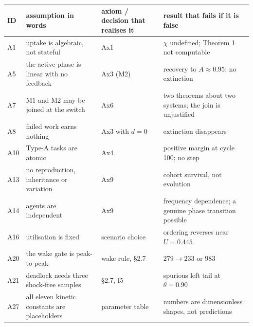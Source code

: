 \documentclass[11pt,a4paper]{article}
\newcounter{none}
\begin{document}
{\def\LTcaptype{none} %
\begin{longtable}[]{@{}
  >{\raggedright\arraybackslash}p{}
  >{\raggedright\arraybackslash}p{}
  >{\raggedright\arraybackslash}p{}
  >{\raggedright\arraybackslash}p{}@{}}
\toprule\noalign{}
\begin{minipage}[b]{\linewidth}\raggedright
ID
\end{minipage} & \begin{minipage}[b]{\linewidth}\raggedright
assumption in words
\end{minipage} & \begin{minipage}[b]{\linewidth}\raggedright
axiom / decision that realises it
\end{minipage} & \begin{minipage}[b]{\linewidth}\raggedright
result that fails if it is false
\end{minipage} \\
\midrule\noalign{}
\endhead
\bottomrule\noalign{}
\endlastfoot
A1 & uptake is algebraic, not stateful & Ax1 & \(\chi\) undefined; Theorem 1 not computable \\
A5 & the active phase is linear with no feedback & Ax3 (M2) & recovery to \(A\approx0.95\); no extinction \\
A7 & M1 and M2 may be joined at the switch & Ax6 & two theorems about two systems; the join is unjustified \\
A8 & failed work earns nothing & Ax3 with \(d=0\) & extinction disappears \\
A10 & Type-A tasks are atomic & Ax4 & positive margin at cycle 100; no step \\
A13 & no reproduction, inheritance or variation & Ax9 & cohort survival, not evolution \\
A14 & agents are independent & Ax9 & frequency dependence; a genuine phase transition possible \\
A16 & utilisation is fixed & scenario choice & ordering reverses near \(U=0.445\) \\
A20 & the wake gate is peak-to-peak & wake rule, §2.7 & \(279\to233\) or \(983\) \\
A21 & deadlock needs three shock-free samples & §2.7, I5 & spurious left tail at \(\theta=0.90\) \\
A27 & all eleven kinetic constants are placeholders & parameter table & numbers are dimensionless shapes, not predictions \\
\end{longtable}
}
\end{document}
